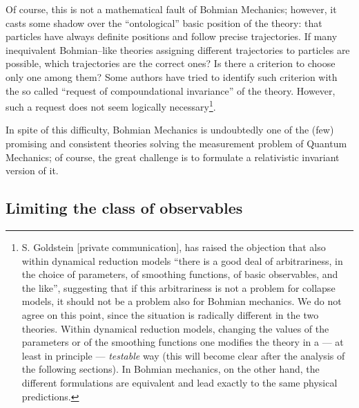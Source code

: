 \documentclass[10pt,a4paper]{article}
\begin{document}
Of course, this is not a mathematical fault of Bohmian Mechanics;
however, it casts some shadow over the ``ontological'' basic
position of the theory: that particles have always definite
positions and follow precise trajectories. If many inequivalent
Bohmian--like theories assigning different trajectories to
particles are possible, which trajectories are the correct ones?
Is there a criterion to choose only one among them? Some authors
\cite{rim1} have tried to identify such criterion with the so
called ``request of compoundational invariance'' of the theory.
However, such a request does not seem logically
necessary\footnote{S. Goldstein [private communication], has
raised the objection that also within dynamical reduction models
``there is a good deal of arbitrariness, in the choice of parameters,
of smoothing functions, of basic observables, and the like'',
suggesting that if this arbitrariness is not a problem for
collapse models, it should not be a problem also for Bohmian
mechanics. We do not agree on this point, since
the situation is radically different in the two theories. Within dynamical
reduction models, changing the values of the parameters or of
the smoothing functions one modifies the theory in a --- at least
in principle --- {\it testable} way (this will become clear after
the analysis of the following sections). In Bohmian mechanics, on
the other hand, the different formulations are equivalent and lead
exactly to the same physical predictions.}.

In spite of this difficulty, Bohmian Mechanics is undoubtedly one
of the (few) promising and consistent theories solving the
measurement problem of Quantum Mechanics; of course, the great
challenge is to formulate a relativistic invariant version of it.


\subsection{Limiting the class of observables} \label{sec33}
\end{document}
